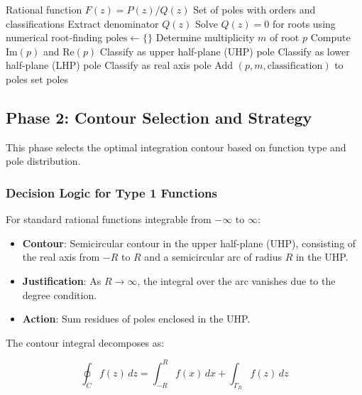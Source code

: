\documentclass[conference]{IEEEtran}
\begin{document}
\begin{algorithm}[h]
\caption{Pole Detection and Classification}
\begin{algorithmic}[1]
\REQUIRE Rational function $F(z) = P(z)/Q(z)$
\ENSURE Set of poles with orders and classifications
\STATE Extract denominator $Q(z)$
\STATE Solve $Q(z) = 0$ for roots using numerical root-finding
\STATE $\text{poles} \gets \{\}$
    \STATE Determine multiplicity $m$ of root $p$
    \STATE Compute $\text{Im}(p)$ and $\text{Re}(p)$
        \STATE Classify as upper half-plane (UHP) pole
        \STATE Classify as lower half-plane (LHP) pole
    \ELSE
        \STATE Classify as real axis pole
    \ENDIF
    \STATE Add $(p, m, \text{classification})$ to poles set
\ENDFOR
\RETURN poles
\end{algorithmic}
\end{algorithm}

\subsection{Phase 2: Contour Selection and Strategy}

This phase selects the optimal integration contour based on function type and pole distribution.

\subsubsection{Decision Logic for Type 1 Functions}

For standard rational functions integrable from $-\infty$ to $\infty$:

\begin{itemize}
    \item \textbf{Contour}: Semicircular contour in the upper half-plane (UHP), consisting of the real axis from $-R$ to $R$ and a semicircular arc of radius $R$ in the UHP.
    \item \textbf{Justification}: As $R \to \infty$, the integral over the arc vanishes due to the degree condition.
    \item \textbf{Action}: Sum residues of poles enclosed in the UHP.
\end{itemize}

The contour integral decomposes as:

\begin{equation}
\oint_C f(z) \, dz = \int_{-R}^{R} f(x) \, dx + \int_{\Gamma_R} f(z) \, dz
\end{equation}
\end{document}
